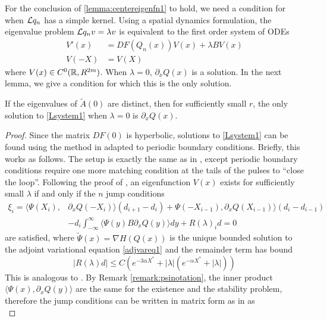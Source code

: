 \documentclass[thesis.tex]{subfiles}
\begin{document}
For the conclusion of \cref{lemma:centereigenfn1} to hold, we need a condition for when $\mathcal{L}{q_n}$ has a simple kernel. Using a spatial dynamics formulation, the eigenvalue problem $\mathcal{L}{q_n}v = \lambda v$ is equivalent to the first order system of ODEs 
\begin{equation}\label{Lsystem1}
\begin{aligned}
V'(x) &= DF(Q_n(x))V(x) + \lambda B V(x) \\
V(-X) &= V(X)
\end{aligned}
\end{equation}
where $V(x) \in C^0(\mathbb{R}, R^{2m})$. When $\lambda = 0$, $\partial_x Q(x)$ is a solution. In the next lemma, we give a condition for which this is the only solution.

\begin{lemma}\label{Lsystemeigs}
If the eigenvalues of $\tilde{A}(0)$ are distinct, then for sufficiently small $r$, the only solution to \cref{Lsystem1} when $\lambda = 0$ is $\partial_x Q(x)$.
\begin{proof}
Since the matrix $DF(0)$ is hyperbolic, solutions to \cref{Lsystem1} can be found using the method in \cite{Sandstede1998} adapted to periodic boundary conditions. Briefly, this works as follows. The setup is exactly the same as in \cite{Sandstede1998}, except periodic boundary conditions require one more matching condition at the tails of the pulses to ``close the loop''. Following the proof of \cite[Theorem 2]{Sandstede1998}, an eigenfunction $V(x)$ exists for sufficiently small $\lambda$ if and only if the $n$ jump conditions
\begin{align*}
\xi_i = \langle \Psi(X_i), &\partial_x Q(-X_i) \rangle (d_{i+1} - d_i) + \Psi(-X_{i-1}), \partial_x Q(X_{i-1}) \rangle (d_i - d_{i-1}) \\
&- d_i \int_{-\infty}^\infty \langle \Psi(y) B \partial_x Q(y) \rangle dy + R(\lambda)_i d = 0
\end{align*}
are satisfied, where $\tilde{\Psi}(x) = \nabla H(Q(x))$ is the unique bounded solution to the adjoint variational equation \cref{adjvareq1} and the remainder term has bound
\[
|R(\lambda)d| \leq C \left( e^{-3 \alpha X^*} + |\lambda|(e^{-\alpha X^*} + |\lambda| ) \right)
\]
This is analogous to \cite[(3.56)]{Sandstede1998}. By Remark \ref{remark:psinotation}, the inner product $\langle \Psi(x), \partial_x Q(y) \rangle$ are the same for the existence and the stability problem, therefore the jump conditions can be written in matrix form as in \cite[Theorem 2]{Sandstede1998} as
\begin{equation}\label{Ljumps}

\end{equation}
\end{proof}
\end{lemma}
\end{document}
